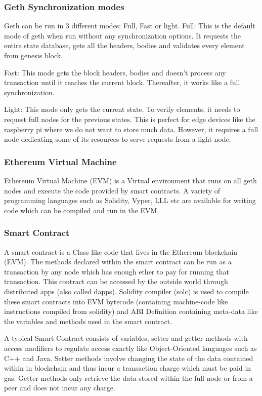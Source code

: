 \documentclass[11pt,openright]{report}
\begin{document}
\subsubsection{Geth Synchronization modes}
Geth can be run in 3 different modes: Full, Fast or light.
Full: This is the default mode of geth when run without any synchronization options. It requests the entire state database, gets all the headers, bodies and validates every element from genesis block.

Fast: This mode gets the block headers, bodies and doesn't process any transaction until it reaches the current block. Thereafter, it works like a full synchronization.

Light: This mode only gets the current state. To verify elements, it needs to request full nodes for the previous states. This is perfect for edge devices like the raspberry pi where we do not want to store much data. However, it requires a full node dedicating some of its resources to serve requests from a light node.

\subsubsection{Ethereum Virtual Machine}
Ethereum Virtual Machine (EVM) is a Virtual environment that runs on all geth nodes and execute the code provided by smart contracts. A variety of programming languages such as Solidity, Vyper, LLL etc are available for writing code which can be compiled and run in the EVM.

\subsubsection{Smart Contract}
A smart contract is a Class like code that lives in the Ethereum blockchain (EVM). The methods declared within the smart contract can be run as a transaction by any node which has enough ether to pay for running that transaction. This contract can be accessed by the outside world through distributed apps (also called dapps). Solidity compiler (solc) is used to compile these smart contracts into EVM bytecode (containing machine-code like instructions compiled from solidity) and ABI Definition containing meta-data like the variables and methods used in the smart contract. 

A typical Smart Contract consists of variables, setter and getter methods with access modifiers to regulate access exactly like Object-Oriented languages such as C++ and Java. Setter methods involve changing the state of the data contained within in blockchain and thus incur a transaction charge which must be paid in gas. Getter methods only retrieve the data stored within the full node or from a peer and does not incur any charge.
\end{document}
